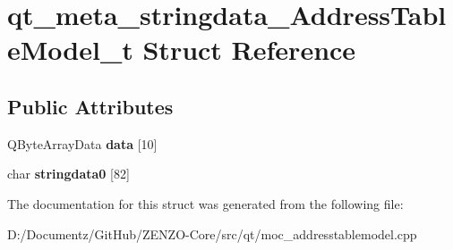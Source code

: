 \hypertarget{structqt__meta__stringdata___address_table_model__t}{}\section{qt\+\_\+meta\+\_\+stringdata\+\_\+\+Address\+Table\+Model\+\_\+t Struct Reference}
\label{structqt__meta__stringdata___address_table_model__t}
\subsection*{Public Attributes}
\begin{DoxyCompactItemize}
\item 
\mbox{\label{structqt__meta__stringdata___address_table_model__t_ae482300038c5ebc3ff0f152a89fa29c2}} 
Q\+Byte\+Array\+Data {\bfseries data} \mbox{[}10\mbox{]}
\item 
\mbox{\label{structqt__meta__stringdata___address_table_model__t_a0e6a926221a9903592f811424c5ed7b1}} 
char {\bfseries stringdata0} \mbox{[}82\mbox{]}
\end{DoxyCompactItemize}


The documentation for this struct was generated from the following file\+:\begin{DoxyCompactItemize}
\item 
D\+:/\+Documentz/\+Git\+Hub/\+Z\+E\+N\+Z\+O-\/\+Core/src/qt/moc\+\_\+addresstablemodel.\+cpp\end{DoxyCompactItemize}
